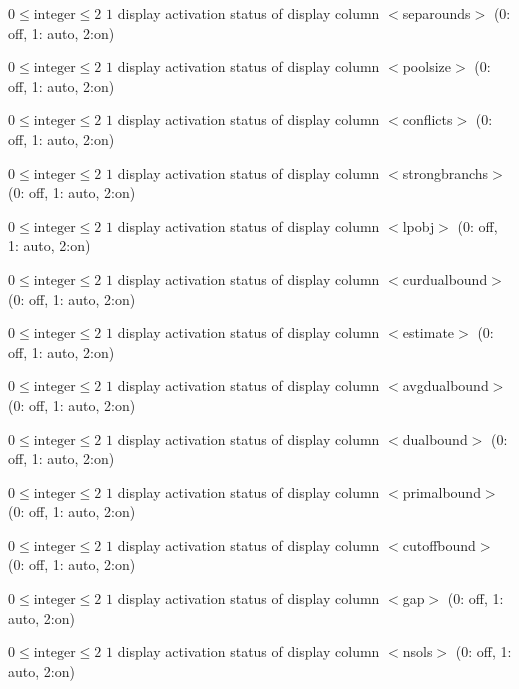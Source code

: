 %
{$0\leq\textrm{integer}\leq2$}%
{$1$}%
{display activation status of display column $<$separounds$>$ (0: off, 1: auto, 2:on)}%
{}

%
{$0\leq\textrm{integer}\leq2$}%
{$1$}%
{display activation status of display column $<$poolsize$>$ (0: off, 1: auto, 2:on)}%
{}

%
{$0\leq\textrm{integer}\leq2$}%
{$1$}%
{display activation status of display column $<$conflicts$>$ (0: off, 1: auto, 2:on)}%
{}

%
{$0\leq\textrm{integer}\leq2$}%
{$1$}%
{display activation status of display column $<$strongbranchs$>$ (0: off, 1: auto, 2:on)}%
{}

%
{$0\leq\textrm{integer}\leq2$}%
{$1$}%
{display activation status of display column $<$lpobj$>$ (0: off, 1: auto, 2:on)}%
{}

%
{$0\leq\textrm{integer}\leq2$}%
{$1$}%
{display activation status of display column $<$curdualbound$>$ (0: off, 1: auto, 2:on)}%
{}

%
{$0\leq\textrm{integer}\leq2$}%
{$1$}%
{display activation status of display column $<$estimate$>$ (0: off, 1: auto, 2:on)}%
{}

%
{$0\leq\textrm{integer}\leq2$}%
{$1$}%
{display activation status of display column $<$avgdualbound$>$ (0: off, 1: auto, 2:on)}%
{}

%
{$0\leq\textrm{integer}\leq2$}%
{$1$}%
{display activation status of display column $<$dualbound$>$ (0: off, 1: auto, 2:on)}%
{}

%
{$0\leq\textrm{integer}\leq2$}%
{$1$}%
{display activation status of display column $<$primalbound$>$ (0: off, 1: auto, 2:on)}%
{}

%
{$0\leq\textrm{integer}\leq2$}%
{$1$}%
{display activation status of display column $<$cutoffbound$>$ (0: off, 1: auto, 2:on)}%
{}

%
{$0\leq\textrm{integer}\leq2$}%
{$1$}%
{display activation status of display column $<$gap$>$ (0: off, 1: auto, 2:on)}%
{}

%
{$0\leq\textrm{integer}\leq2$}%
{$1$}%
{display activation status of display column $<$nsols$>$ (0: off, 1: auto, 2:on)}%
{}

